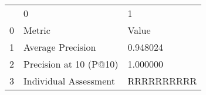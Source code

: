 \begin{tabular}{lll}
 & 0 & 1 \\
0 & Metric & Value \\
1 & Average Precision & 0.948024 \\
2 & Precision at 10 (P@10) & 1.000000 \\
3 & Individual Assessment & RRRRRRRRRR \\
\end{tabular}
